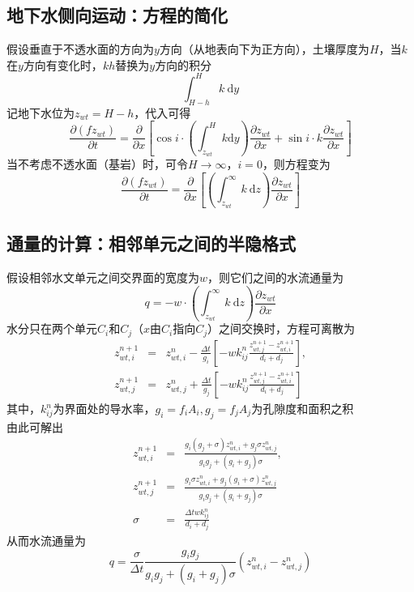 \subsection{地下水侧向运动：方程的简化}
假设垂直于不透水面的方向为$y$方向（从地表向下为正方向），土壤厚度为$H$，当$k$在$y$方向有变化时，$kh$替换为$y$方向的积分
\begin{equation}
\int^H_{H-h} k \  \mathrm{d}y
\end{equation}
记地下水位为$z_{wt}=H-h$，代入可得
\begin{equation}
\frac{\partial \left(fz_{wt}\right)}{\partial t} = \frac{\partial}{\partial x} \left[ \cos i \cdot \left(\int^{H}_{z_{wt}} k \mathrm{d}y\right)\frac{\partial z_{wt}}{\partial x} +\sin i\cdot k\frac{\partial z_{wt}}{\partial x}\right]
\end{equation}
当不考虑不透水面（基岩）时，可令$H\to \infty$，$i=0$，则方程变为
\begin{equation}
\frac{\partial \left(fz_{wt}\right)}{\partial t} = \frac{\partial}{\partial x} \left[ \left(\int^\infty_{z_{wt}} k\ \mathrm{d}z\right)\frac{\partial z_{wt}}{\partial x} \right]
\end{equation}

\subsection{通量的计算：相邻单元之间的半隐格式}
假设相邻水文单元之间交界面的宽度为$w$，则它们之间的水流通量为
$$q=-w\cdot \left(\int^\infty_{z_{wt}} k\ \mathrm{d}z\right)\frac{\partial z_{wt}}{\partial x} $$
水分只在两个单元$C_i$和$C_j$（$x$由$C_i$指向$C_j$）之间交换时，方程可离散为
\begin{eqnarray}
z_{wt,i}^{n+1} &=& z_{wt,i}^{n} - \frac{\Delta t}{g_i}\left[ -  w k^n_{ij} \frac{z_{wt,j}^{n+1} - z_{wt,i}^{n+1}}{d_i+d_j} \right], \\
z_{wt,j}^{n+1} &=& z_{wt,j}^{n} + \frac{\Delta t}{g_j}\left[ -  w k^n_{ij} \frac{z_{wt,j}^{n+1} - z_{wt,i}^{n+1}}{d_i+d_j} \right]
\end{eqnarray}
其中，$k^n_{ij}$为界面处的导水率，$g_i=f_iA_i,g_j=f_jA_j$为孔隙度和面积之积\\
由此可解出
\begin{eqnarray}
z_{wt,i}^{n+1} &=& \frac{g_i\left(g_j+\sigma\right)z_{wt,i}^{n} +g_j\sigma z_{wt,j}^{n}}{g_ig_j+\left(g_i+g_j\right)\sigma},\\
z_{wt,j}^{n+1} &=& \frac{g_i\sigma z_{wt,i}^{n} +g_j\left(g_i+\sigma\right)z_{wt,j}^{n}}{g_ig_j+\left(g_i+g_j\right)\sigma}\quad \\
\sigma &=& \frac{\Delta t wk_{ij}^n}{d_i+d_j}
\end{eqnarray}
从而水流通量为
\begin{equation}
q = \frac{\sigma}{\Delta t} \frac{g_ig_j}{g_ig_j+\left(g_i+g_j\right)\sigma} \left( z_{wt,i}^{n} - z_{wt,j}^{n} \right)
\end{equation}

